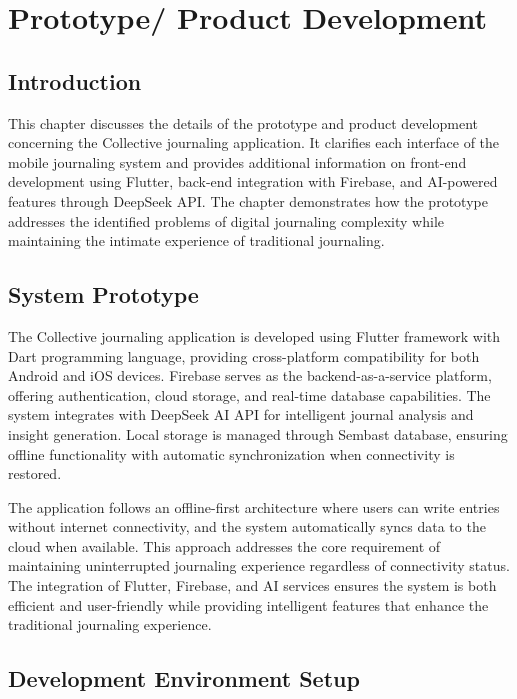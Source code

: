 \chapter{Prototype/ Product Development}

\section{Introduction}

This chapter discusses the details of the prototype and product development concerning the Collective journaling application. It clarifies each interface of the mobile journaling system and provides additional information on front-end development using Flutter, back-end integration with Firebase, and AI-powered features through DeepSeek API. The chapter demonstrates how the prototype addresses the identified problems of digital journaling complexity while maintaining the intimate experience of traditional journaling.

\section{System Prototype}

The Collective journaling application is developed using Flutter framework with Dart programming language, providing cross-platform compatibility for both Android and iOS devices. Firebase serves as the backend-as-a-service platform, offering authentication, cloud storage, and real-time database capabilities. The system integrates with DeepSeek AI API for intelligent journal analysis and insight generation. Local storage is managed through Sembast database, ensuring offline functionality with automatic synchronization when connectivity is restored.

The application follows an offline-first architecture where users can write entries without internet connectivity, and the system automatically syncs data to the cloud when available. This approach addresses the core requirement of maintaining uninterrupted journaling experience regardless of connectivity status. The integration of Flutter, Firebase, and AI services ensures the system is both efficient and user-friendly while providing intelligent features that enhance the traditional journaling experience.

\section{Development Environment Setup}

